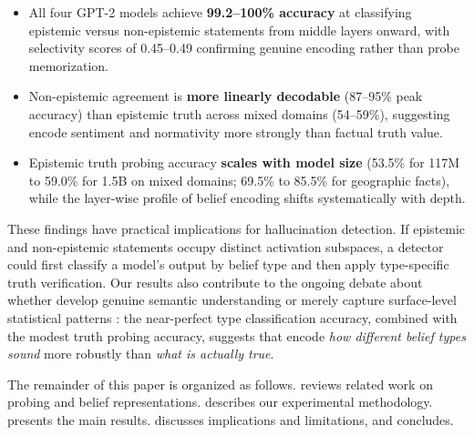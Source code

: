 \begin{itemize}[leftmargin=*,itemsep=0pt,topsep=0pt]
    \item All four GPT-2 models achieve \textbf{99.2--100\% accuracy} at classifying epistemic versus non-epistemic statements from middle layers onward, with selectivity scores of 0.45--0.49 confirming genuine encoding rather than probe memorization.
    \item Non-epistemic agreement is \textbf{more linearly decodable} (87--95\% peak accuracy) than epistemic truth across mixed domains (54--59\%), suggesting \llms encode sentiment and normativity more strongly than factual truth value.
    \item Epistemic truth probing accuracy \textbf{scales with model size} (53.5\% for 117M to 59.0\% for 1.5B on mixed domains; 69.5\% to 85.5\% for geographic facts), while the layer-wise profile of belief encoding shifts systematically with depth.
\end{itemize}

These findings have practical implications for hallucination detection. If epistemic and non-epistemic statements occupy distinct activation subspaces, a detector could first classify a model's output by belief type and then apply type-specific truth verification. Our results also contribute to the ongoing debate about whether \llms develop genuine semantic understanding or merely capture surface-level statistical patterns \citep{marks2023geometry,liu2023cognitive}: the near-perfect type classification accuracy, combined with the modest truth probing accuracy, suggests that \llms encode \emph{how different belief types sound} more robustly than \emph{what is actually true}.

The remainder of this paper is organized as follows.  reviews related work on probing and belief representations.  describes our experimental methodology.  presents the main results.  discusses implications and limitations, and  concludes.
